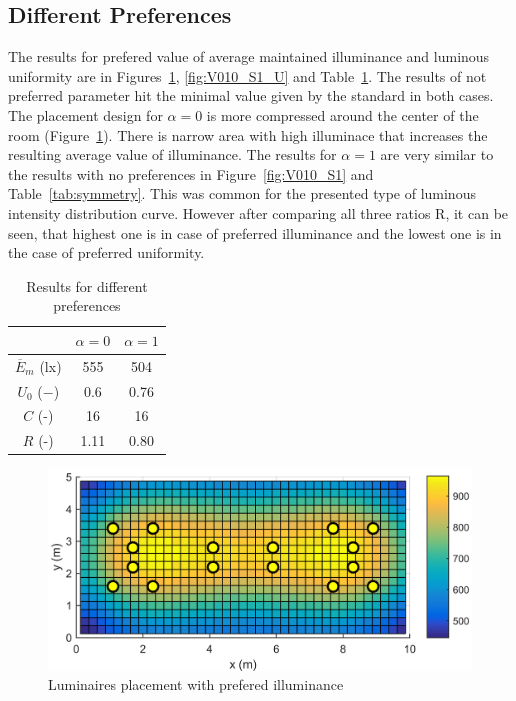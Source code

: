 \subsection{Different Preferences}

The results for prefered value of average maintained illuminance and luminous uniformity are in Figures~\ref{fig:V010_S1_E}, \ref{fig:V010_S1_U} and Table~\ref{tab:preferences}. The results of not preferred parameter hit the minimal value given by the standard in both cases. The placement design for $\alpha = 0$ is more compressed around the center of the room (Figure~\ref{fig:V010_S1_E}). There is narrow area with high illuminace that increases the resulting average value of illuminance. The results for $\alpha = 1$ are very similar to the results with no preferences in Figure~\ref{fig:V010_S1} and Table~\ref{tab:symmetry}. This was common for the presented type of luminous intensity distribution curve. However after comparing all three ratios R, it can be seen, that highest one is in case of preferred illuminance and the lowest one is in the case of preferred uniformity.

\begin{table}[tb]
	\renewcommand{\arraystretch}{1.8}
	\caption{Results for different preferences}
 	\label{tab:preferences}
	\centering
  \begin{tabular}{| c | c | c |}
    \hline
    & $\alpha = 0$ & $\alpha = 1$ \\
    \hline
    $\overline{E}_{m}$ (lx) & 555 & 504 \\
    \hline
		$U_0$ ($-$)& 0.6 & 0.76 \\
    \hline
		$C$ (-) & 16 & 16 \\
	\hline
		$R$ (-) & 1.11 & 0.80 \\
  \hline
  \end{tabular}
\end{table}

\begin{figure}[tb]
  \centering
  \includegraphics[width=\columnwidth]{../Vysledky/MSTR_SLB_4x18W_5G4_Fit2_E_V010_S1}
  \caption{Luminaires placement with prefered illuminance}
  \label{fig:V010_S1_E}
\end{figure}

